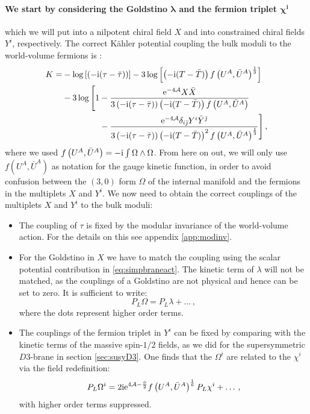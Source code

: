 \documentclass[a4paper,12pt,twoside,openright]{report}
\newcommand{\be}{\begin{equation}}
\newcommand{\ee}{\end{equation}}
\newcommand{\bea}{\begin{equation}\begin{aligned}}
\newcommand{\eea}{\end{aligned}\end{equation}}
\def\rmi{{\rm i}}
\def\rme{{\rm e}}
\def\jb{{\bar \jmath}}
\begin{document}
\paragraph{We start by considering the Goldstino $\mathbf{\lambda}$ and the fermion triplet $\mathbf{\chi^i}$} which we will put into a nilpotent chiral field $X$ and into constrained chiral fields $Y^i$, respectively. The correct Kähler potential coupling the bulk moduli to the world-volume fermions is \cite{GarciadelMoral:2017vnz}:
\bea 
K = &- \log\left[\left(-\rmi(\tau-\bar{\tau})\right)\right] - 3 \log\left[\left(-\rmi(T-\bar{T})\right)f\left(U^A,\bar{U}^A\right)^{\frac{1}{3}}\right]\\
&- 3\log \Bigg[ 1- \frac{\rme^{-4\mathcal{A}} X\bar{X}}{3\left(-\rmi (\tau-\bar{\tau})\right)\left(-\rmi(T-\bar{T})\right)f\left(U^A,\bar{U}^A\right)}\\
&\qquad \qquad \;\,  - \frac{\rme^{-4\mathcal{A}}\delta_{i\jb}Y^i \bar{Y}^\jb}{3\left(-\rmi (\tau-\bar{\tau})\right)\left(-\rmi(T-\bar{T})\right)^2 f\left(U^A,\bar{U}^A\right)^{\frac{1}{3}}}\Bigg]\,,
\eea
where we used $f\left(U^A,\bar{U}^A\right) = -\rmi \int \Omega \wedge \Omega$. From here on out, we will only use $f\left(U^A,\bar{U}^A\right)$ as notation for the gauge kinetic function, in order to avoid confusion between the $(3,0)$ form $\Omega$ of the internal manifold and the fermions in the multiplets $X$ and $Y^i$. We now need to obtain the correct couplings of the multiplets $X$ and $Y^i$ to the bulk moduli:
\begin{itemize}
\item The coupling of $\tau$ is fixed by the modular invariance of the world-volume action. For the details on this see appendix \ref{app:modinv}.
\item For the Goldstino in $X$ we have to match the coupling using the scalar potential contribution in \eqref{eq:simpbraneact}. The kinetic term of $\lambda$ will not be matched, as the couplings of a Goldstino are not physical and hence can be set to zero. It is sufficient to write:
\be 
P_L \Omega = P_L \lambda + \ldots\,,
\ee
where the dots represent higher order terms.
\item The couplings of the fermion triplet in $Y^i$ can be fixed by comparing with the kinetic terms of the massive spin-$1/2$ fields, as we did for the supersymmetric $D3$-brane in section \ref{sec:susyD3}. One finds that the $\Omega^i$ are related to the $\chi^i$ via the field redefinition:
\be 
P_L \Omega^i = 2 \rmi \rme^{4\mathcal{A}-\frac{\phi}{2}} f\left(U^A ,\bar{U}^A\right)^{\frac{1}{6}} P_L \chi^i + \ldots\,,
\ee
with higher order terms suppressed.
\end{itemize}
\end{document}
